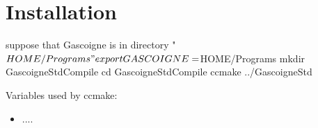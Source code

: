 \documentclass[12pt]{article}
\begin{document}
\title{}
\author{}
\date{}
\maketitle


\section{Installation}


suppose that Gascoigne is in directory "${HOME}/Programs"

export GASCOIGNE= ${HOME}/Programs
mkdir GascoigneStdCompile
cd GascoigneStdCompile
ccmake  ../GascoigneStd

Variables used by ccmake:
\begin{itemize}
\item ....
\end{itemize}
\end{document}
